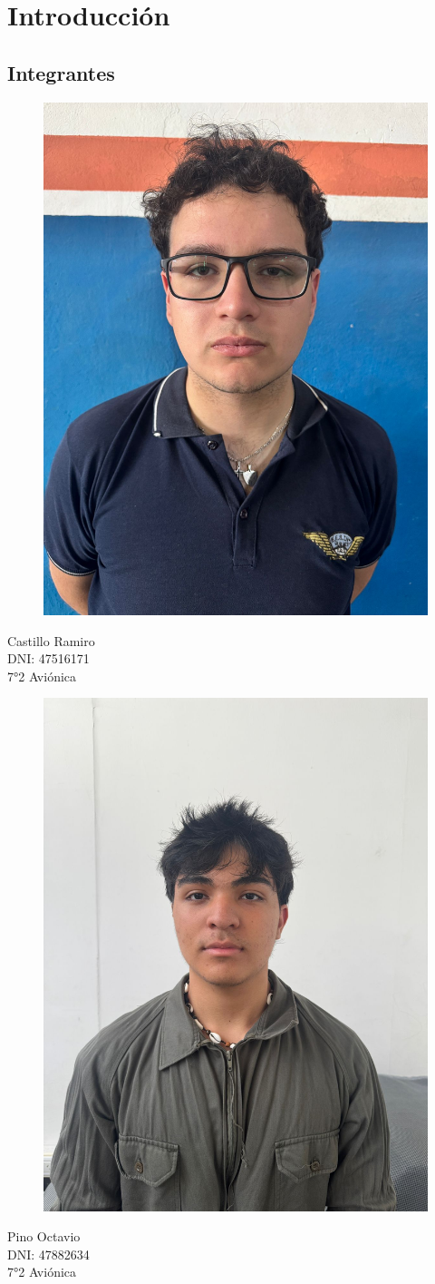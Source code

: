 \documentclass[12pt,a4paper]{article}
\begin{document}
\section{Introducción}

\subsection{Integrantes}
\begin{figure}[H]
    \centering
    \includegraphics[width=0.4\linewidth]{Carpeta tecnica/Fotoramiro.jpg}
\end{figure}
\begin{center}
Castillo Ramiro\\
DNI: 47516171\\
7°2 Aviónica
\end{center}

\begin{figure}[H]
    \centering
    \includegraphics[width=0.4\linewidth]{Carpeta tecnica/fotopino.jpg}
\end{figure}
\begin{center}

Pino Octavio\\
DNI: 47882634\\
7°2 Aviónica
\end{center}
\end{document}

